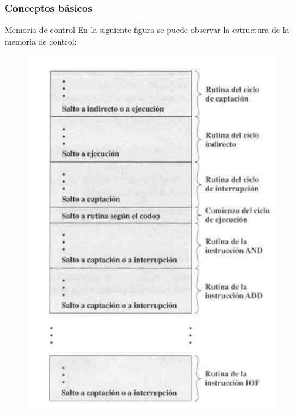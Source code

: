 \documentclass{beamer}
\begin{document}
\begin{frame}
	\frametitle{Conceptos básicos}
	\begin{block}{Memoria de control}
	En la siguiente figura se puede observar la estructura de la memoria de control:
	\end{block}	
	\begin{figure}[H]
		\centering
		\includegraphics[scale=0.2]{imagenes/memoriacontrol.png} 
	\end{figure}
\end{frame}
\end{document}
